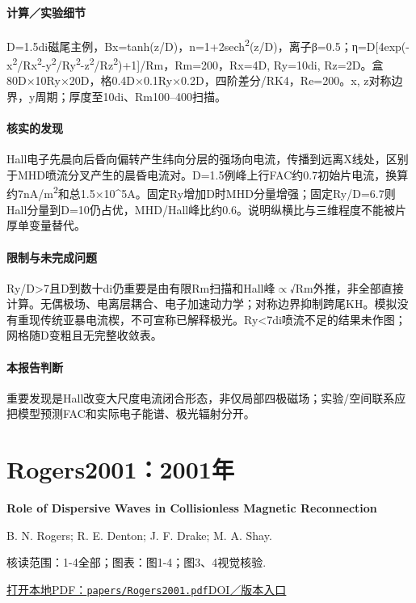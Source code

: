 \documentclass[UTF8,a4paper,11pt,openany,fontset=fandol]{ctexbook}
\begin{document}
\paragraph{计算／实验细节}D=1.5di磁尾主例，Bx=tanh(z/D)，n=1+2sech\textsuperscript{2}(z/D)，离子β=0.5；η=D[4exp(-x\textsuperscript{2}/Rx\textsuperscript{2}-y\textsuperscript{2}/Ry\textsuperscript{2}-z\textsuperscript{2}/Rz\textsuperscript{2})+1]/Rm，Rm=200，Rx=4D, Ry=10di, Rz=2D。盒80D×10Ry×20D，格0.4D×0.1Ry×0.2D，四阶差分/RK4，Re=200。x, z对称边界，y周期；厚度至10di、Rm100–400扫描。

\paragraph{核实的发现}Hall电子先晨向后昏向偏转产生纬向分层的强场向电流，传播到远离X线处，区别于MHD喷流分叉产生的晨昏电流对。D=1.5例峰上行FAC约0.7初始片电流，换算约7nA/m\textsuperscript{2}和总1.5×10\textasciicircum{}5A。固定Ry增加D时MHD分量增强；固定Ry/D=6.7则Hall分量到D=10仍占优，MHD/Hall峰比约0.6。说明纵横比与三维程度不能被片厚单变量替代。

\paragraph{限制与未完成问题}Ry/D>7且D到数十di仍重要是由有限Rm扫描和Hall峰\ensuremath{\propto}√Rm外推，非全部直接计算。无偶极场、电离层耦合、电子加速动力学；对称边界抑制跨尾KH。模拟没有重现传统亚暴电流楔，不可宣称已解释极光。Ry<7di喷流不足的结果未作图；网格随D变粗且无完整收敛表。

\paragraph{本报告判断}重要发现是Hall改变大尺度电流闭合形态，非仅局部四极磁场；实验/空间联系应把模型预测FAC和实际电子能谱、极光辐射分开。

\section{Rogers2001：2001年}\label{paper:Rogers2001}

\textbf{Role of Dispersive Waves in Collisionless Magnetic Reconnection}\citep{Rogers2001}\

B. N. Rogers;  R. E. Denton;  J. F. Drake;  M. A. Shay.

\textsf{核读范围：}1-4全部；\textsf{图表：}图1-4；图3、4视觉核验.

\href{run:../papers/Rogers2001.pdf}{打开本地PDF：\texttt{papers/Rogers2001.pdf}}\quad\href{https://doi.org/10.1103/physrevlett.87.195004}{DOI／版本入口}
\end{document}
